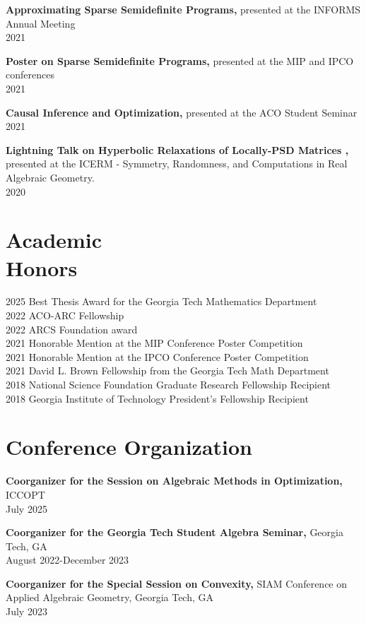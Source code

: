 \documentclass[margin]{res}
\begin{document}
\begin{resume}
{\bf  Approximating Sparse Semidefinite Programs,} presented at the INFORMS Annual Meeting \\ 2021 

{\bf  Poster on Sparse Semidefinite Programs,} presented at the MIP and IPCO conferences \\ 2021 

{\bf  Causal Inference and Optimization,} presented at the ACO Student Seminar \\ 2021

{\bf  Lightning Talk on Hyperbolic Relaxations of Locally-PSD Matrices ,} presented at the ICERM - Symmetry, Randomness, and Computations in Real Algebraic Geometry.
 \\ 2020



\section{Academic \\ Honors} 
2025 Best Thesis Award for the Georgia Tech Mathematics Department\\
2022 ACO-ARC Fellowship\\
2022 ARCS Foundation award\\
2021 Honorable Mention at the MIP Conference Poster Competition\\
2021 Honorable Mention at the IPCO Conference Poster Competition\\
2021 David L. Brown Fellowship from the Georgia Tech Math Department\\
2018 National Science Foundation Graduate Research Fellowship Recipient\\
2018 Georgia Institute of Technology President's Fellowship Recipient

\section{Conference Organization}
{\bf Coorganizer for the Session on Algebraic Methods in Optimization,} ICCOPT    \\       July 2025

{\bf Coorganizer for the Georgia Tech Student Algebra Seminar,} Georgia Tech, GA    \\       August 2022-December 2023

{\bf Coorganizer for the Special Session on Convexity,} SIAM Conference on Applied Algebraic Geometry, Georgia Tech, GA    \\       July 2023


\end{resume}
\end{document}

